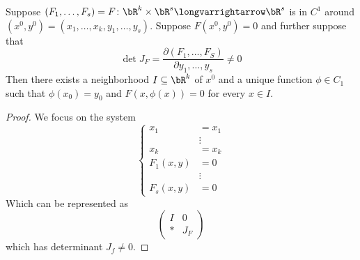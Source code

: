 \documentclass[10pt]{article}
\begin{document}
\begin{thrm*}

    Suppose $(F_1,\dots,F_s)=F\colon\bR^k\times\bR^s\longvarrightarrow\bR^s$ is in $C^1$ around $(x^0,y^0)=(x_1,\dots,x_k,y_1,\dots,y_s)$.
    Suppose $F(x^0,y^0)=0$ and further suppose that
    \[ \det J_F = \frac{\partial(F_1,\dots,F_S)}{\partial{y_1,\dots,y_s}}\neq 0 \]
        Then there exists a neighborhood $I\subseteq\bR^k$ of $x^0$ and a unique function $\phi\in C_1$ such that $\phi(x_0)=y_0$ and $F(x,\phi(x))=0$ for every $x\in I$.

\end{thrm*}

\begin{proof}

    We focus on the system
        \[ \left\{\begin{aligned} x_1&=x_1\\&\vdots\\x_k&=x_k\\F_1(x,y)&=0\\&\vdots\\F_s(x,y)&=0\end{aligned}\right. \]
    Which can be represented as
        \[ \begin{pmatrix} I & 0 \\ * & J_F \end{pmatrix} \]
    which has determinant $J_f\neq0$.

\end{proof}
\end{document}
